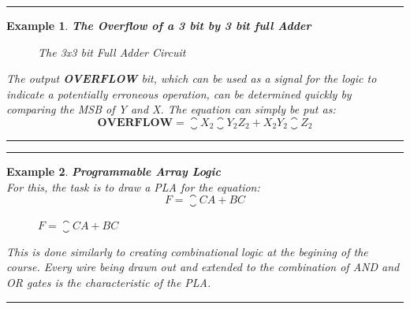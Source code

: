 \documentclass[12pt]{article}
\newtheorem{example}{Example}
\newenvironment{examp}
{
	\vspace{.5cm}
	\hrule
\begin{example}\upshape}
	{\hrule
		\vspace{0.5cm}
\end{example}}
\begin{document}
\begin{examp}
	\vspace{.5mm}
	\textbf{The Overflow of a 3 bit by 3 bit full Adder}\\
	\begin{figure}[H]
		\caption{The 3x3 bit Full Adder Circuit}
	\end{figure}

	The output \textbf{OVERFLOW} bit, which can be used as a signal for the logic
	to indicate a potentially erroneous operation, can be determined quickly by comparing the MSB of Y and
	X. The equation can simply be put as:
	\[
		\mathbf{OVERFLOW} = \closure{X_2}\closure{Y_2}Z_2 + X_{2}Y_{2}\closure{Z_{2}}
	\]

\end{examp}
\begin{examp}
	\vspace{.5mm}
	\textbf{Programmable Array Logic}\\
	For this, the task is to draw a PLA for the equation:
	\[
		F = \closure{C}A + BC
	\]
	\begin{figure}[H]
		\caption{$F = \closure{C}A + BC$}
	\end{figure}
	This is done similarly to creating combinational logic at the begining of the
	course. Every wire being drawn out and extended to the combination of AND and
	OR gates is the characteristic of the PLA.
	\vspace{5mm}
\end{examp}
\end{document}
